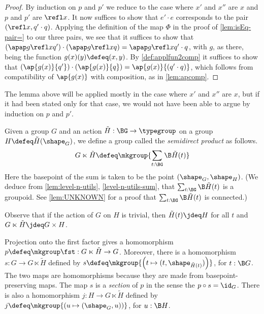 \begin{proof}
  By induction on $p$ and $p'$ we reduce to the case where $x'$ and $x''$ are $x$ and $p$ and $p'$ are $\refl x$.
  It now suffices to show that $e' \cdot e$ corresponds to the pair $(\refl x , q' \cdot q)$.
  Applying the definition of the map $\Phi$ in the proof of \cref{lem:isEq-pair=} to our three pairs, we see that it suffices to show that
  $\left( \apap g {\refl x} {q'} \right) \cdot \left( \apap g {\refl x} {q} \right) = \apap g {\refl x} {q' \cdot q}$, with $g$, as there, being the function $ g(x)(y) \defeq (x,y)$.
  By \cref{def:applfun2comp} it suffices to show that $\left( \ap {g(x)} {q'} \right) \cdot \left( \ap {g(x)} {q} \right) = \ap {g(x)} {(q' \cdot q)}$, which follows from
  compatibility of $\ap {g(x)}$ with composition, as in \cref{lem:apcomp}.
\end{proof}

The lemma above will be applied mostly in the case where $x'$ and $x''$ are $x$, but if it had been stated only for that case, we would not have
been able to argue by induction on $p$ and $p'$.

\begin{definition}\label{def:semidirect-product}
  Given a group $G$ and an action $\tilde H : \BG \to \typegroup$ on a group $H \defeq \tilde H(\shape_G)$, we define a group called the {\em
    semidirect product} as follows.
  $$G \ltimes \tilde H \defeq \mkgroup { \sum_{t:\BG} \B \tilde H(t) }$$
  Here the basepoint of the sum is taken to be the point $(\shape_G,\shape_H)$.
  (We deduce from \cref{lem:level-n-utils}, \cref{level-n-utils-sum}, that $\sum_{t:\BG} \B \tilde H(t)$ is a groupoid.
  See \cref{lem:UNKNOWN} for a proof that $\sum_{t:\BG} \B \tilde H(t)$ is connected.)
\end{definition}

Observe that if the action of $G$ on $H$ is trivial, then $\tilde H(t) \jdeq H$ for all $t$ and $G \ltimes \tilde H \jdeq G \times H$.

Projection onto the first factor gives a homomorphism $p \defeq \mkgroup \fst : G \ltimes \tilde H \to G$.
Moreover, there is a homomorphism $s : G \to G \ltimes \tilde H$ defined by
$ s \defeq \mkgroup {\left( t \mapsto (t,\shape_{\tilde H(t)}) \right) }$, for $t : \B G$.
The two maps are homomorphisms because they are made from basepoint-preserving maps.
The map $s$ is a \emph{section} of $p$ in the sense the $p \circ s = \id_G$.
There is also a homomorphism $j : H \to G \ltimes \tilde H$ defined by $j \defeq \mkgroup { \left( u \mapsto (\shape_G,u) \right) }$, for $u : \B H$.

